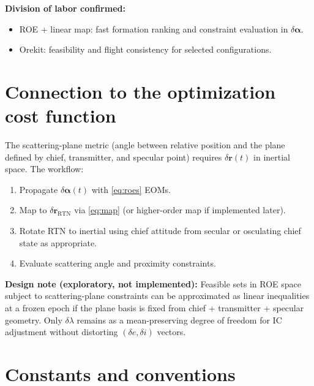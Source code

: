 \documentclass[11pt]{article}
\begin{document}
\textbf{Division of labor confirmed:}
\begin{itemize}
    \item ROE + linear map: fast formation ranking and constraint evaluation in $\delta\bm{\alpha}$.
    \item Orekit: feasibility and flight consistency for selected configurations.
\end{itemize}

\section{Connection to the optimization cost function}

The scattering-plane metric (angle between relative position and the plane defined by chief, transmitter, and specular point) requires $\delta\mathbf{r}(t)$ in inertial space. The workflow:

\begin{enumerate}
    \item Propagate $\delta\bm{\alpha}(t)$ with \eqref{eq:roes} EOMs.
    \item Map to $\delta\mathbf{r}_\mathrm{RTN}$ via \eqref{eq:map} (or higher-order map if implemented later).
    \item Rotate RTN to inertial using chief attitude from secular or osculating chief state as appropriate.
    \item Evaluate scattering angle and proximity constraints.
\end{enumerate}

\textbf{Design note (exploratory, not implemented):} Feasible sets in ROE space subject to scattering-plane constraints can be approximated as linear inequalities at a frozen epoch if the plane basis is fixed from chief + transmitter + specular geometry. Only $\delta\lambda$ remains as a mean-preserving degree of freedom for IC adjustment without distorting $(\delta e,\delta i)$ vectors.

\section{Constants and conventions}
\end{document}
